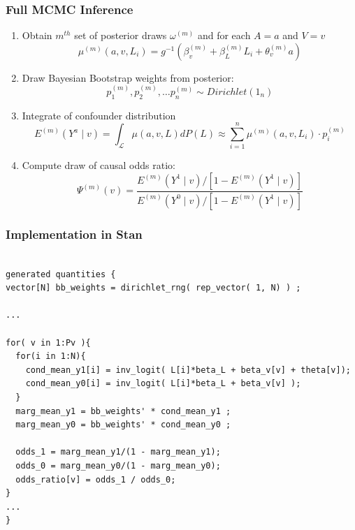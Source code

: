 \documentclass[xcolor=x11names,compress]{beamer}
\renewcommand{\(}{\begin{columns}}
\renewcommand{\)}{\end{columns}}
\newcommand{\<}[1]{\begin{column}{#1}}
\renewcommand{\>}{\end{column}}
\begin{document}
\begin{frame}
	\frametitle{Full MCMC Inference}

	\begin{enumerate}
	\scriptsize
		\item Obtain $m^{th}$ set of posterior draws $\omega^{(m)}$ and for each $A=a$ and $V=v$
		$$  \mu^{(m)}( a, v, L_i ) = g^{-1}( \beta_v^{(m)} + \beta_L^{(m)}L_i + \theta_v^{(m)} a) $$
		
		\pause
		\item Draw Bayesian Bootstrap weights from posterior:
		$$ p_1^{(m)}, p_2^{(m)}, \dots p_n^{(m)} \sim Dirichlet(1_n) $$
		
		\pause
		\item Integrate of confounder distribution
		$$ E^{(m)}(Y^a \mid v ) = \int_{\mathcal{L}} \mu(a, v, L) dP(L) \approx \sum_{i=1}^n \mu^{(m)}( a, v, L_i ) \cdot p_i^{(m)} $$
		
		\pause
		\item Compute draw of causal odds ratio:
		$$ \Psi^{(m)} (v) = \frac{ E^{(m)}(Y^1 \mid v)/[1-E^{(m)}(Y^1 \mid v)] }{E^{(m)}(Y^0 \mid v)/[1-E^{(m)}(Y^1 \mid v)] } $$
	\end{enumerate}
\end{frame}

\begin{frame}[fragile]
	\frametitle{Implementation in Stan}
	\scriptsize
	\begin{verbatim}
	
generated quantities {
vector[N] bb_weights = dirichlet_rng( rep_vector( 1, N) ) ;

...

for( v in 1:Pv ){
  for(i in 1:N){
    cond_mean_y1[i] = inv_logit( L[i]*beta_L + beta_v[v] + theta[v]);
    cond_mean_y0[i] = inv_logit( L[i]*beta_L + beta_v[v] );
  }
  marg_mean_y1 = bb_weights' * cond_mean_y1 ;
  marg_mean_y0 = bb_weights' * cond_mean_y0 ;
	
  odds_1 = marg_mean_y1/(1 - marg_mean_y1);
  odds_0 = marg_mean_y0/(1 - marg_mean_y0);
  odds_ratio[v] = odds_1 / odds_0;
}
...
}

	\end{verbatim}
\end{frame}
\end{document}
